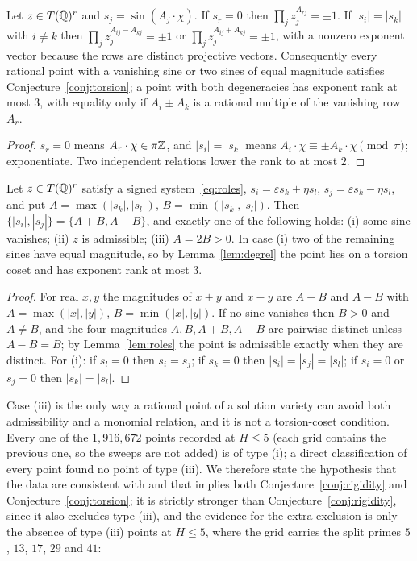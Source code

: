 \begin{lemma}\label{lem:degrel}
Let $z\in T(\mathbb Q)^r$ and $s_j=\sin(A_j\cdot\chi)$. If $s_r=0$ then $\prod_j z_j^{A_{rj}}=\pm1$. If $|s_i|=|s_k|$ with $i\ne k$ then $\prod_j z_j^{A_{ij}-A_{kj}}=\pm1$ or $\prod_j z_j^{A_{ij}+A_{kj}}=\pm1$, with a nonzero exponent vector because the rows are distinct projective vectors. Consequently every rational point with a vanishing sine or two sines of equal magnitude satisfies Conjecture~\ref{conj:torsion}; a point with both degeneracies has exponent rank at most $3$, with equality only if $A_i\pm A_k$ is a rational multiple of the vanishing row $A_r$.
\end{lemma}
\begin{proof}
$s_r=0$ means $A_r\cdot\chi\in\pi\mathbb Z$, and $|s_i|=|s_k|$ means $A_i\cdot\chi\equiv\pm A_k\cdot\chi\pmod\pi$; exponentiate. Two independent relations lower the rank to at most $2$.
\end{proof}
\begin{theorem}\label{thm:trichotomy}
Let $z\in T(\mathbb Q)^r$ satisfy a signed system~\eqref{eq:roles}, $s_i=\varepsilon s_k+\eta s_l$, $s_j=\varepsilon s_k-\eta s_l$, and put $A=\max(|s_k|,|s_l|)$, $B=\min(|s_k|,|s_l|)$. Then $\{|s_i|,|s_j|\}=\{A+B,A-B\}$, and exactly one of the following holds: (i) some sine vanishes; (ii) $z$ is admissible; (iii) $A=2B>0$. In case (i) two of the remaining sines have equal magnitude, so by Lemma~\ref{lem:degrel} the point lies on a torsion coset and has exponent rank at most $3$.
\end{theorem}
\begin{proof}
For real $x,y$ the magnitudes of $x+y$ and $x-y$ are $A+B$ and $A-B$ with $A=\max(|x|,|y|)$, $B=\min(|x|,|y|)$. If no sine vanishes then $B>0$ and $A\ne B$, and the four magnitudes $A,B,A+B,A-B$ are pairwise distinct unless $A-B=B$; by Lemma~\ref{lem:roles} the point is admissible exactly when they are distinct. For (i): if $s_l=0$ then $s_i=s_j$; if $s_k=0$ then $|s_i|=|s_j|=|s_l|$; if $s_i=0$ or $s_j=0$ then $|s_k|=|s_l|$.
\end{proof}
Case (iii) is the only way a rational point of a solution variety can avoid both admissibility and a monomial relation, and it is not a torsion-coset condition. Every one of the $1{,}916{,}672$ points recorded at $H\le5$ (each grid contains the previous one, so the sweeps are not added) is of type (i); a direct classification of every point found no point of type (iii). We therefore state the hypothesis that the data are consistent with and that implies both Conjecture~\ref{conj:rigidity} and Conjecture~\ref{conj:torsion}; it is strictly stronger than Conjecture~\ref{conj:rigidity}, since it also excludes type (iii), and the evidence for the extra exclusion is only the absence of type (iii) points at $H\le5$, where the grid carries the split primes $5$, $13$, $17$, $29$ and $41$:
